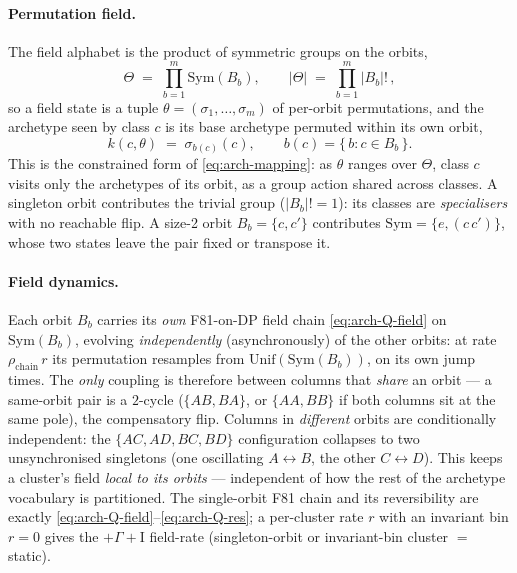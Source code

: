 \paragraph{Permutation field.} The field alphabet is the product of
symmetric groups on the orbits,
\begin{equation}
  \Theta \;=\; \prod_{b=1}^{m}\mathrm{Sym}(B_b),
  \qquad |\Theta| \;=\; \prod_{b=1}^{m}|B_b|!\,,
  \label{eq:orbit-field-space}
\end{equation}
so a field state is a tuple $\theta=(\sigma_1,\dots,\sigma_m)$ of per-orbit
permutations, and the archetype seen by class $c$ is its base archetype
permuted within its own orbit,
\begin{equation}
  k(c,\theta) \;=\; \sigma_{b(c)}(c),
  \qquad b(c) = \{\,b : c \in B_b\,\}.
  \label{eq:orbit-action}
\end{equation}
This is the constrained form of \eqref{eq:arch-mapping}: as $\theta$ ranges
over $\Theta$, class $c$ visits only the archetypes of its orbit, as a group
action shared across classes. A singleton orbit contributes the trivial
group ($|B_b|!=1$): its classes are \emph{specialisers} with no reachable
flip. A size-2 orbit $B_b=\{c,c'\}$ contributes
$\mathrm{Sym}=\{e,(c\,c')\}$, whose two states leave the pair fixed or
transpose it.

\paragraph{Field dynamics.} Each orbit $B_b$ carries its \emph{own} F81-on-DP
field chain \eqref{eq:arch-Q-field} on $\mathrm{Sym}(B_b)$, evolving
\emph{independently} (asynchronously) of the other orbits: at rate
$\rho_{\text{chain}}\,r$ its permutation resamples from
$\mathrm{Unif}(\mathrm{Sym}(B_b))$, on its own jump times. The \emph{only}
coupling is therefore between columns that \emph{share} an orbit --- a
same-orbit pair is a $2$-cycle ($\{AB,BA\}$, or $\{AA,BB\}$ if both columns
sit at the same pole), the compensatory flip. Columns in \emph{different}
orbits are conditionally independent: the $\{AC,AD,BC,BD\}$ configuration
collapses to two unsynchronised singletons (one oscillating $A\!\leftrightarrow
\!B$, the other $C\!\leftrightarrow\!D$). This keeps a cluster's field
\emph{local to its orbits} --- independent of how the rest of the archetype
vocabulary is partitioned. The single-orbit F81 chain and its reversibility
are exactly \eqref{eq:arch-Q-field}--\eqref{eq:arch-Q-res}; a per-cluster rate
$r$ with an invariant bin $r=0$ gives the $+\Gamma+\mathrm{I}$ field-rate
(singleton-orbit or invariant-bin cluster $=$ static).

